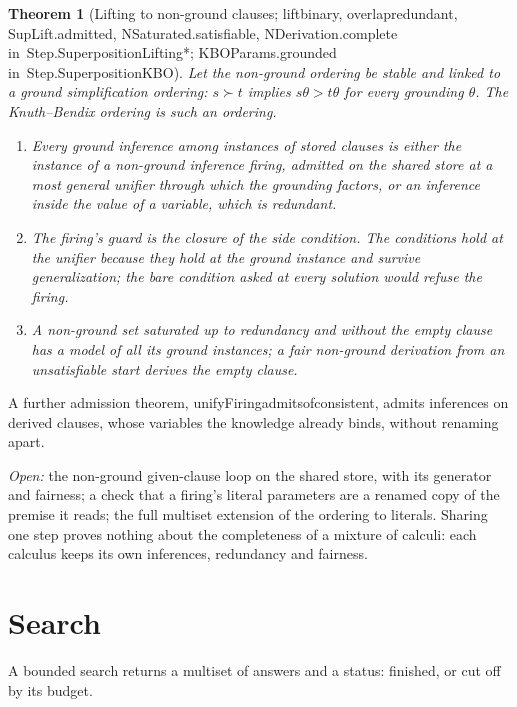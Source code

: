\documentclass[11pt]{article}
\newtheorem{theorem}{Theorem}
\theoremstyle{remark}
\newcommand{\lean}[1]{{\ttfamily\def\_{\textunderscore\allowbreak}#1}}
\newcommand{\inmod}[1]{in~{\ttfamily\def\_{\textunderscore\allowbreak}#1}}
\begin{document}
\begin{theorem}[Lifting to non-ground clauses; \lean{lift\_binary}, \lean{overlap\_redundant},
\lean{SupLift.admitted}, \lean{NSaturated.satisfiable}, \lean{NDerivation.complete}
\inmod{Step.SuperpositionLifting*}; \lean{KBOParams.grounded} \inmod{Step.SuperpositionKBO}]
Let the non-ground ordering be stable and linked to a ground simplification ordering: $s\succ t$ implies
$s\theta>t\theta$ for every grounding $\theta$. The Knuth--Bendix ordering is such an ordering.
\begin{enumerate}
\item Every ground inference among instances of stored clauses is either the instance of a non-ground
  inference firing, admitted on the shared store at a most general unifier through which the grounding
  factors, or an inference inside the value of a variable, which is redundant.
\item The firing's guard is the closure of the side condition. The conditions hold at the unifier because
  they hold at the ground instance and survive generalization; the bare condition asked at every
  solution would refuse the firing.
\item A non-ground set saturated up to redundancy and without the empty clause has a model of all its
  ground instances; a fair non-ground derivation from an unsatisfiable start derives the empty clause.
\end{enumerate}
\end{theorem}

A further admission theorem, \lean{unifyFiring\_admits\_of\_consistent}, admits inferences on derived
clauses, whose variables the knowledge already binds, without renaming apart.

\emph{Open:} the non-ground given-clause loop on the shared store, with its generator and fairness; a
check that a firing's literal parameters are a renamed copy of the premise it reads; the full multiset
extension of the ordering to literals. Sharing one step proves nothing about the completeness of a
mixture of calculi: each calculus keeps its own inferences, redundancy and fairness.

\section{Search}\label{sec:search}

A bounded search returns a multiset of answers and a status: finished, or cut off by its budget.
\end{document}
